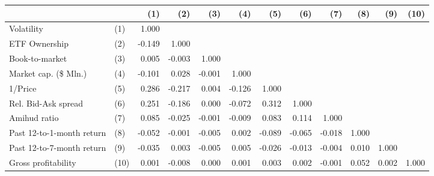 \begin{tabular}{llrrrrrrrrrr}
\toprule
                    &      &    (1) &    (2) &    (3) &    (4) &    (5) &    (6) &    (7) &   (8) &   (9) &  (10) \\
\midrule
Volatility & (1) &  1.000 &        &        &        &        &        &        &       &       &       \\
ETF Ownership & (2) & -0.149 &  1.000 &        &        &        &        &        &       &       &       \\
Book-to-market & (3) &  0.005 & -0.003 &  1.000 &        &        &        &        &       &       &       \\
Market cap. (\$ Mln.) & (4) & -0.101 &  0.028 & -0.001 &  1.000 &        &        &        &       &       &       \\
1/Price & (5) &  0.286 & -0.217 &  0.004 & -0.126 &  1.000 &        &        &       &       &       \\
Rel. Bid-Ask spread & (6) &  0.251 & -0.186 &  0.000 & -0.072 &  0.312 &  1.000 &        &       &       &       \\
Amihud ratio & (7) &  0.085 & -0.025 & -0.001 & -0.009 &  0.083 &  0.114 &  1.000 &       &       &       \\
Past 12-to-1-month return & (8) & -0.052 & -0.001 & -0.005 &  0.002 & -0.089 & -0.065 & -0.018 & 1.000 &       &       \\
Past 12-to-7-month return & (9) & -0.035 &  0.003 & -0.005 &  0.005 & -0.026 & -0.013 & -0.004 & 0.010 & 1.000 &       \\
Gross profitability & (10) &  0.001 & -0.008 &  0.000 &  0.001 &  0.003 &  0.002 & -0.001 & 0.052 & 0.002 & 1.000 \\
\bottomrule
\end{tabular}
